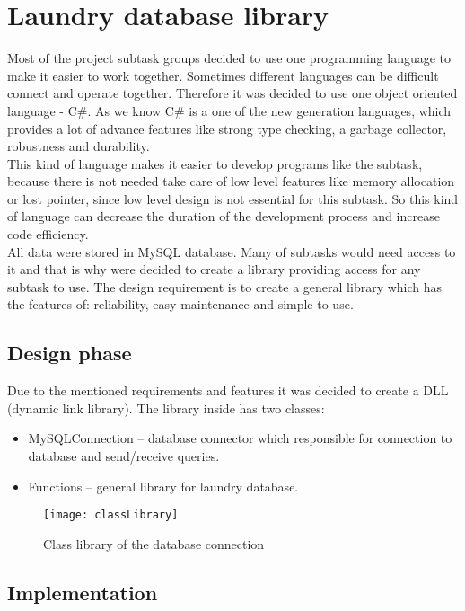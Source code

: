 %
\section{Laundry database library}

Most of the project subtask groups decided to use one programming language to make it easier to work together. Sometimes different languages can be difficult connect and operate together. Therefore it was decided to use one object oriented language - C\#. As we know C\# is a one of the new generation languages, which provides a lot of advance features like strong type checking, a garbage collector, robustness and durability. \\ This kind of language makes it easier to develop programs like the subtask, because there is not needed take care of low level features like memory allocation or lost pointer, since low level design is not essential for this subtask. So this kind of language can decrease the duration of the development process and increase code efficiency. \\

All data were stored in MySQL database. Many of subtasks would need access to it and that is why were decided to create a library providing access for any subtask to use. The design requirement is to create a general library which has the features of:  reliability, easy maintenance and simple to use.

\subsection{Design phase}

Due to the mentioned requirements and features it was decided to create a DLL (dynamic link library). The library inside has two classes:

\begin{itemize}
	\item MySQLConnection – database connector which responsible for connection to database and send/receive queries.
	\item Functions – general library for laundry database.
\end{itemize}

\begin{figure}[h]
	\centering
		\texttt{[image: classLibrary]}
	\caption{Class library of the database connection}
	\label{fig:planning}
\end{figure}

\newpage
\subsection{Implementation}

